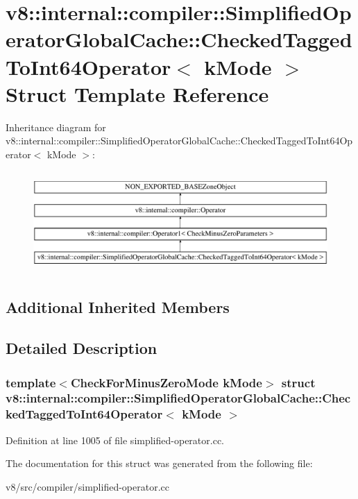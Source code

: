 \hypertarget{structv8_1_1internal_1_1compiler_1_1SimplifiedOperatorGlobalCache_1_1CheckedTaggedToInt64Operator}{}\section{v8\+:\+:internal\+:\+:compiler\+:\+:Simplified\+Operator\+Global\+Cache\+:\+:Checked\+Tagged\+To\+Int64\+Operator$<$ k\+Mode $>$ Struct Template Reference}
\label{structv8_1_1internal_1_1compiler_1_1SimplifiedOperatorGlobalCache_1_1CheckedTaggedToInt64Operator}
Inheritance diagram for v8\+:\+:internal\+:\+:compiler\+:\+:Simplified\+Operator\+Global\+Cache\+:\+:Checked\+Tagged\+To\+Int64\+Operator$<$ k\+Mode $>$\+:\begin{figure}[H]
\begin{center}
\leavevmode
\includegraphics[height=3.916084cm]{structv8_1_1internal_1_1compiler_1_1SimplifiedOperatorGlobalCache_1_1CheckedTaggedToInt64Operator}
\end{center}
\end{figure}
\subsection*{Additional Inherited Members}


\subsection{Detailed Description}
\subsubsection*{template$<$Check\+For\+Minus\+Zero\+Mode k\+Mode$>$\newline
struct v8\+::internal\+::compiler\+::\+Simplified\+Operator\+Global\+Cache\+::\+Checked\+Tagged\+To\+Int64\+Operator$<$ k\+Mode $>$}



Definition at line 1005 of file simplified-\/operator.\+cc.



The documentation for this struct was generated from the following file\+:\begin{DoxyCompactItemize}
\item 
v8/src/compiler/simplified-\/operator.\+cc\end{DoxyCompactItemize}
